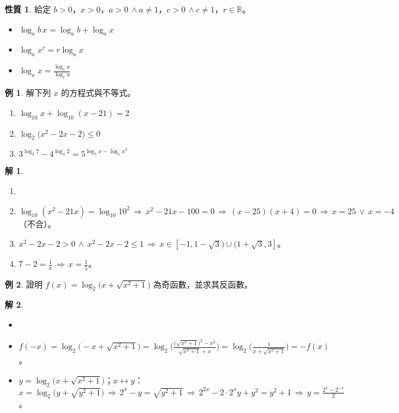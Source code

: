 \documentclass[12pt]{extarticle}
\newcommand{\ds}{\displaystyle}
\newcommand{\ie}{\,\Longrightarrow\,}
\theoremstyle{definition}
\newtheorem*{prp}{性質}
\newtheorem*{ex}{例}
\newtheorem*{sol}{解}
\begin{document}
\begin{prp} 給定 $b > 0$，$x > 0$，$a > 0\,\wedge a\not=1$，$c > 0\,\wedge c\not=1$，$r\in\mathbb{R}$。
  \begin{itemize}\setlength\itemsep{0em}
    \item $\log_a b\,x = \log_a b + \log_a x$
    \item $\ds\log_a x^r = r\log_a x$
    \item $\ds\log_a x = \frac{\log_c x}{\log_c a}$
  \end{itemize}
\end{prp}

\begin{ex} 解下列 $x$ 的方程式與不等式。
  \begin{enumerate}\setlength\itemsep{0em}
    \item $\ds\log_{10} x + \log_{10}(x - 21) = 2$
    \item $\ds\log_2\big(x^2 - 2x - 2\big)\leqslant 0$
    \item $\ds 3^{\log_3 7} - 4^{\log_4 2} = 5^{\log_5 x - \log_5 x^2}$
  \end{enumerate}
\end{ex}

\begin{sol}
  \vspace{-0.5em}
  \begin{enumerate}\setlength\itemsep{0em}
    \item[]
    \item $\ds\log_{10} (x^2 - 21 x) = \log_{10} 10^2 \ie x^2 - 21x - 100 = 0 \ie (x - 25)(x + 4) = 0 \ie x = 25\,\vee\,x = -4$（不合）。
    \item $\ds x^2 - 2x - 2 > 0\,\wedge\, x^2 - 2x - 2\leqslant 1 \ie x \in [-1, 1 - \sqrt{3})\cup (1 + \sqrt{3}, 3]$。
    \item $\ds 7 - 2 = \frac{1}{x} \ie x = \frac{1}{5}$。
  \end{enumerate}
\end{sol}

\begin{ex}
  證明 $\ds f(x) = \log_2\big(x + \sqrt{x^2 + 1}\big)$ 為奇函數，並求其反函數。
\end{ex}

\begin{sol}
  \vspace{-0.5em}
  \begin{itemize}\setlength\itemsep{0em}
    \item[]
    \item $\ds f(-x) = \log_2\big(-x + \sqrt{x^2 + 1}\big) = \log_2\bigg(\frac{\big(\sqrt{x^2 + 1}\big)^2 - x^2}{\sqrt{x^2 + 1} + x}\bigg) = \log_2\bigg(\frac{1}{x + \sqrt{x^2 + 1}}\bigg) = -f(x)$。
    \item $\ds y = \log_2\big(x + \sqrt{x^2 + 1}\big)$；$x\longleftrightarrow y$：$\ds x = \log_2\big(y + \sqrt{y^2 + 1}\big)\ie 2^x - y = \sqrt{y^2 + 1} \ie 2^{2x} - 2\cdot2^x y + y^2 = y^2 + 1 \ie y = \frac{2^x - 2^{-x}}{2}$。
  \end{itemize}
\end{sol}
\end{document}
